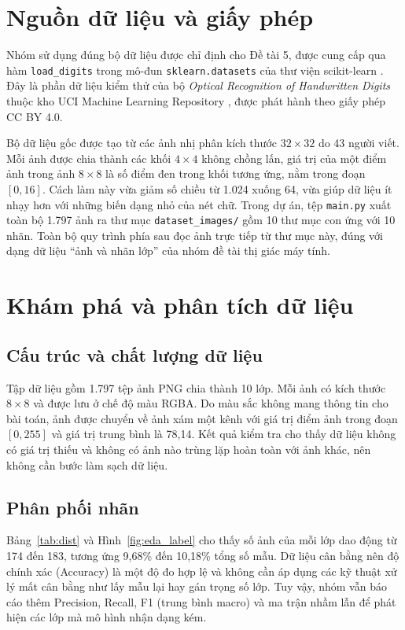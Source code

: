 \documentclass[a4paper,oneside]{report}
\begin{document}
\section{Nguồn dữ liệu và giấy phép}

Nhóm sử dụng đúng bộ dữ liệu được chỉ định cho Đề tài 5, được cung cấp qua hàm \texttt{load\_digits} trong
mô-đun \texttt{sklearn.datasets} của thư viện scikit-learn \cite{sklearn}. Đây là phần dữ liệu kiểm thử của bộ
\emph{Optical Recognition of Handwritten Digits} thuộc kho UCI Machine Learning Repository \cite{uci}, được phát
hành theo giấy phép CC BY 4.0.

Bộ dữ liệu gốc được tạo từ các ảnh nhị phân kích thước $32 \times 32$ do 43 người viết. Mỗi ảnh được chia thành
các khối $4 \times 4$ không chồng lấn, giá trị của một điểm ảnh trong ảnh $8 \times 8$ là số điểm đen trong khối
tương ứng, nằm trong đoạn $[0, 16]$. Cách làm này vừa giảm số chiều từ 1.024 xuống 64, vừa giúp dữ liệu ít nhạy hơn
với những biến dạng nhỏ của nét chữ. Trong dự án, tệp \texttt{main.py} xuất toàn bộ 1.797 ảnh ra thư mục
\nolinkurl{dataset_images/} gồm 10 thư mục con ứng với 10 nhãn. Toàn bộ quy trình phía sau đọc ảnh trực tiếp
từ thư mục này, đúng với dạng dữ liệu ``ảnh và nhãn lớp'' của nhóm đề tài thị giác máy tính.

\section{Khám phá và phân tích dữ liệu}

\subsection{Cấu trúc và chất lượng dữ liệu}

Tập dữ liệu gồm 1.797 tệp ảnh PNG chia thành 10 lớp. Mỗi ảnh có kích thước $8 \times 8$ và được lưu ở chế độ
màu RGBA. Do màu sắc không mang thông tin cho bài toán, ảnh được chuyển về ảnh xám một kênh với giá trị điểm ảnh
trong đoạn $[0, 255]$ và giá trị trung bình là 78,14. Kết quả kiểm tra cho thấy dữ liệu không có giá trị thiếu
và không có ảnh nào trùng lặp hoàn toàn với ảnh khác, nên không cần bước làm sạch dữ liệu.

\subsection{Phân phối nhãn}

Bảng~\ref{tab:dist} và Hình~\ref{fig:eda_label} cho thấy số ảnh của mỗi lớp dao động từ 174 đến 183, tương ứng
9,68\% đến 10,18\% tổng số mẫu. Dữ liệu cân bằng nên độ chính xác (Accuracy) là một độ đo hợp lệ và không cần áp
dụng các kỹ thuật xử lý mất cân bằng như lấy mẫu lại hay gán trọng số lớp. Tuy vậy, nhóm vẫn báo cáo thêm
Precision, Recall, F1 (trung bình macro) và ma trận nhầm lẫn để phát hiện các lớp mà mô hình nhận dạng kém.
\end{document}
